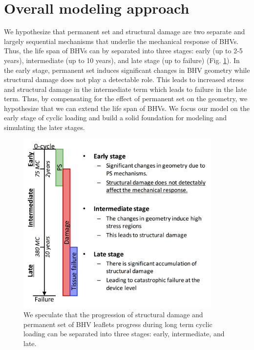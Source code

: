 

\section{Overall modeling approach} \label{sec:modelapproach}

	We hypothesize that permanent set and structural damage are two separate and largely sequential mechanisms that underlie the mechanical response of BHVs. Thus, the life span of BHVs can by separated into three stages: early (up to 2-5 years),  intermediate (up to 10 years), and late stage (up to failure) (Fig. \ref{fig:hypothesis}). In the early stage, permanent set induces significant changes in BHV geometry while structural damage does not play a detectable role. This leads to increased stress and structural damage in the intermediate term which leads to failure in the late term. Thus, by compensating for the effect of permanent set on the geometry, we hypothesize that we can extend the life span of BHVs. We focus our model on the early stage of cyclic loading and build a solid foundation for modeling and simulating the later stages.


\begin{figure}[hbt]
\centering
\includegraphics[width=4in]{Images/chapter4/figure2}
\caption{We speculate that the progression of structural damage and permanent set of BHV leaflets progress during long term cyclic loading can be separated into three stages: early, intermediate, and late.}
\label{fig:hypothesis}
\end{figure}


